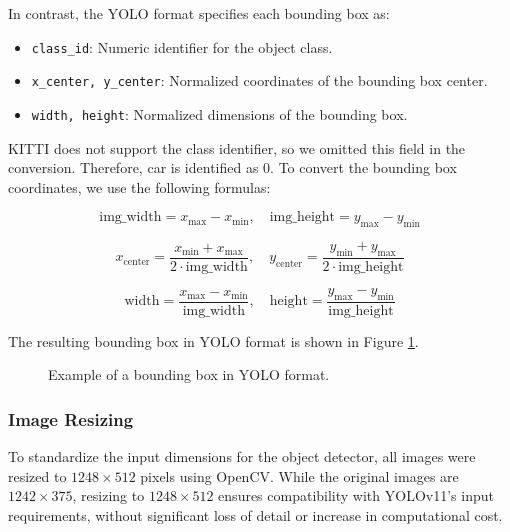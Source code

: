 \documentclass[a4paper,twocolumn]{article}
\begin{document}
In contrast, the \ac{YOLO} format specifies each bounding box as:
\begin{itemize}
    \item \texttt{class\_id}: Numeric identifier for the object class.
    \item \texttt{x\_center, y\_center}: Normalized coordinates of the bounding box center.
    \item \texttt{width, height}: Normalized dimensions of the bounding box.
\end{itemize}

\ac{KITTI} does not support the class identifier, so we omitted this field in the conversion. Therefore, car is identified as 0.
To convert the bounding box coordinates, we use the following formulas:

\[
\text{img\_width} = x_{\text{max}} - x_{\text{min}}, \quad
\text{img\_height} = y_{\text{max}} - y_{\text{min}}
\]

\[
x_{\text{center}} = \frac{x_{\text{min}} + x_{\text{max}}}{2 \cdot \text{img\_width}}, \quad
y_{\text{center}} = \frac{y_{\text{min}} + y_{\text{max}}}{2 \cdot \text{img\_height}}
\]

\[
\text{width} = \frac{x_{\text{max}} - x_{\text{min}}}{\text{img\_width}}, \quad
\text{height} = \frac{y_{\text{max}} - y_{\text{min}}}{\text{img\_height}}
\]

The resulting bounding box in YOLO format is shown in Figure \ref{fig:bounding_box_example}.



\begin{figure}[H]
    \centering
    \caption{Example of a bounding box in YOLO format.}
    \label{fig:bounding_box_example}
\end{figure}

\subsubsection{Image Resizing}
To standardize the input dimensions for the object detector, all images were resized to \( 1248 \times 512 \) pixels using OpenCV.
While the original images are \( 1242 \times 375 \), resizing to \( 1248 \times 512 \) ensures compatibility with YOLOv11’s input requirements, without significant loss of detail or increase in computational cost.
\end{document}

